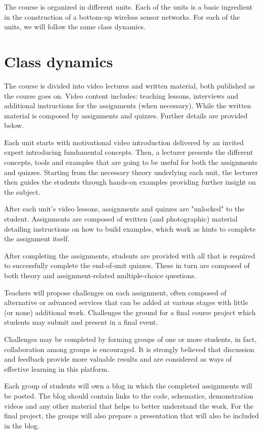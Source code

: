 \documentclass[oneside]{book}   %
\begin{document}
The course is organized in different units.
Each of the units is a basic ingredient in the construction of a bottom-up wireless sensor networks.
For each of the units, we will follow the same class dynamics.

\section{Class dynamics}

The course is divided into video lectures and written material, both published as the course goes on. Video content includes: teaching lessons, interviews and additional instructions for the assignments (when necessary). While the written material is composed by assignments and quizzes. Further details are provided below.

Each unit starts with motivational video introduction delivered by an invited expert introducing fundamental concepts.
Then, a lecturer presents the different concepts, tools and examples that are going to be useful for both the assignments and quizzes.
Starting from the necessary theory underlying each unit, the lecturer then guides the students through hands-on examples providing further insight on the subject.

After each unit's video lessons, assignments and quizzes are "unlocked" to the student. Assignments are composed of written (and photographic) material detailing instructions on how to build examples, which work as hints to complete the assignment itself.

After completing the assignments, students are provided with all that is required to successfully complete the end-of-unit quizzes. These in turn are composed of both theory and assignment-related multiple-choice questions.

Teachers will propose challenges on each assignment, often composed of alternative or advanced services that can be added at various stages with little (or none) additional work. Challenges the ground for a final course project which students may submit and present in a final event.

Challenges may be completed by forming groups of one or more students, in fact, collaboration among groups is encouraged. It is strongly believed that discussion and feedback provide more valuable results and are considered as ways of effective learning in this platform.

Each group of students will own a blog in which the completed assignments will be posted.
The blog should contain links to the code, schematics, demonstration videos and any other material that helps to better understand the work.
For the final project, the groups will also prepare a presentation that will also be included in the blog.
\end{document}
